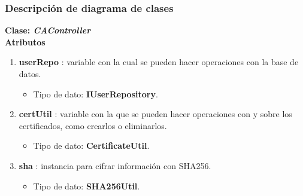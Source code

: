 \documentclass[12pt, a4paper, titlepage]{report}
\begin{document}
			\subsubsection{Descripción de diagrama de clases}
			   
			\textbf{\textcolor{guindapoli}{Clase: \textit{CAController}}}\\
                    
                    \textbf{Atributos}
                    \begin{enumerate}
    		            \item \textbf{userRepo} : variable con la cual se pueden hacer operaciones con la base de datos.
        		        \begin{itemize}
        		            \item Tipo de dato: \textbf{IUserRepository}.
        		        \end{itemize}
        		        \item \textbf{certUtil} : variable con la que se pueden hacer operaciones con y sobre los certificados, como crearlos o eliminarlos.
        		        \begin{itemize}
        		            \item Tipo de dato: \textbf{CertificateUtil}.
        		        \end{itemize}
        		        \item \textbf{sha} : instancia para cifrar información con SHA256.
        		        \begin{itemize}
        		            \item Tipo de dato: \textbf{SHA256Util}.
        		        \end{itemize}
                    \end{enumerate}
                    
\end{document}
